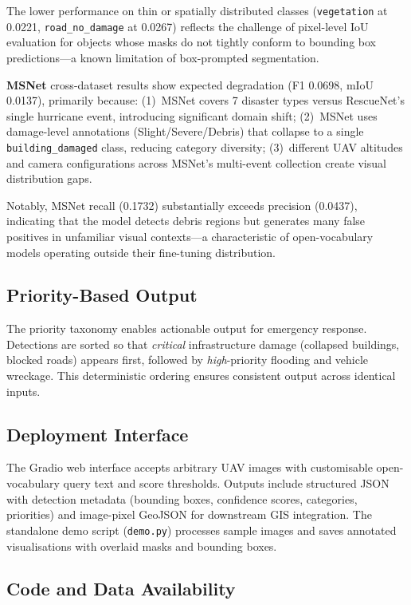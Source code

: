 \documentclass[10pt,a4paper,twocolumn]{article}
\begin{document}
The lower performance on thin or spatially distributed classes (\texttt{vegetation} at 0.0221, \texttt{road\_no\_damage} at 0.0267) reflects the challenge of pixel-level IoU evaluation for objects whose masks do not tightly conform to bounding box predictions---a known limitation of box-prompted segmentation.

\textbf{MSNet} cross-dataset results show expected degradation (F1 0.0698, mIoU 0.0137), primarily because: (1)~MSNet covers 7 disaster types versus RescueNet's single hurricane event, introducing significant domain shift; (2)~MSNet uses damage-level annotations (Slight/Severe/Debris) that collapse to a single \texttt{building\_damaged} class, reducing category diversity; (3)~different UAV altitudes and camera configurations across MSNet's multi-event collection create visual distribution gaps.

Notably, MSNet recall (0.1732) substantially exceeds precision (0.0437), indicating that the model detects debris regions but generates many false positives in unfamiliar visual contexts---a characteristic of open-vocabulary models operating outside their fine-tuning distribution.

\subsection{Priority-Based Output}

The priority taxonomy enables actionable output for emergency response. Detections are sorted so that \textit{critical} infrastructure damage (collapsed buildings, blocked roads) appears first, followed by \textit{high}-priority flooding and vehicle wreckage. This deterministic ordering ensures consistent output across identical inputs.

\subsection{Deployment Interface}

The Gradio web interface accepts arbitrary UAV images with customisable open-vocabulary query text and score thresholds. Outputs include structured JSON with detection metadata (bounding boxes, confidence scores, categories, priorities) and image-pixel GeoJSON for downstream GIS integration. The standalone demo script (\texttt{demo.py}) processes sample images and saves annotated visualisations with overlaid masks and bounding boxes.

\subsection{Code and Data Availability}
\end{document}
